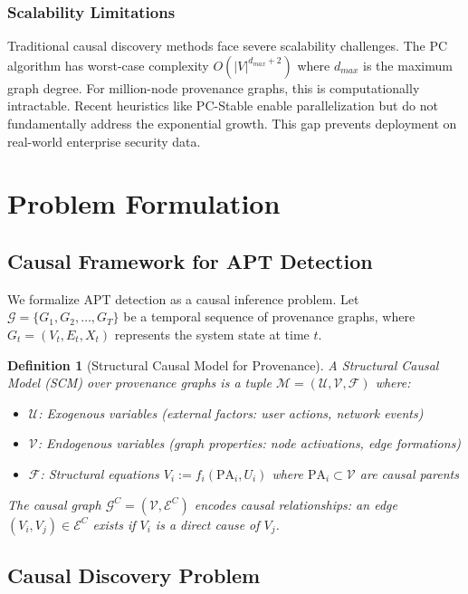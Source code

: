 \documentclass[conference]{IEEEtran}
\newtheorem{definition}{Definition}
\begin{document}
\subsubsection{Scalability Limitations}

Traditional causal discovery methods face severe scalability challenges. The PC algorithm has worst-case complexity $O(|V|^{d_{max}+2})$ where $d_{max}$ is the maximum graph degree. For million-node provenance graphs, this is computationally intractable. Recent heuristics like PC-Stable enable parallelization but do not fundamentally address the exponential growth. This gap prevents deployment on real-world enterprise security data.

\section{Problem Formulation}\label{sec:causal_formulation}

\subsection{Causal Framework for APT Detection}

We formalize APT detection as a causal inference problem. Let $\mathcal{G} = \{G_1, G_2, \ldots, G_T\}$ be a temporal sequence of provenance graphs, where $G_t = (V_t, E_t, X_t)$ represents the system state at time $t$.

\begin{definition}[Structural Causal Model for Provenance]
A Structural Causal Model (SCM) over provenance graphs is a tuple $\mathcal{M} = (\mathcal{U}, \mathcal{V}, \mathcal{F})$ where:
\begin{itemize}
    \item $\mathcal{U}$: Exogenous variables (external factors: user actions, network events)
    \item $\mathcal{V}$: Endogenous variables (graph properties: node activations, edge formations)
    \item $\mathcal{F}$: Structural equations $V_i := f_i(\text{PA}_i, U_i)$ where $\text{PA}_i \subset \mathcal{V}$ are causal parents
\end{itemize}

The causal graph $\mathcal{G}^C = (\mathcal{V}, \mathcal{E}^C)$ encodes causal relationships: an edge $(V_i, V_j) \in \mathcal{E}^C$ exists if $V_i$ is a direct cause of $V_j$.
\end{definition}

\subsection{Causal Discovery Problem}
\end{document}
